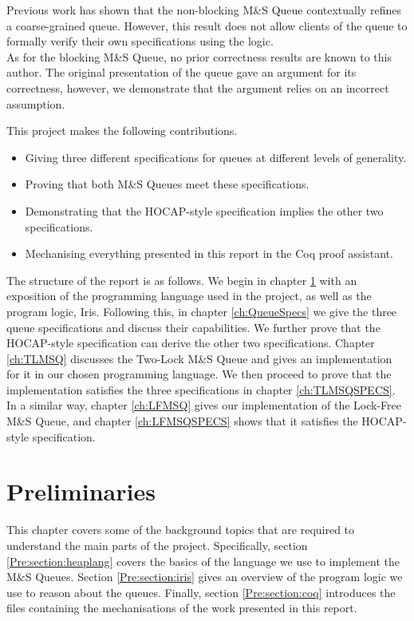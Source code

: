 \documentclass[a4paper, 10pt]{report}
\theoremstyle{definition}
\newcommand{\msq}{M\&S Queue}
\newcommand{\tlmsq}{Two-Lock \msq{}}
\newcommand{\lfmsq}{Lock-Free \msq{}}
\begin{document}
Previous work \citep{DBLP:conf/cpp/VindumB21} has shown that the non-blocking \msq{} contextually refines a coarse-grained queue. However, this result does not allow clients of the queue to formally verify their own specifications using the logic.\\
As for the blocking \msq{}, no prior correctness results are known to this author. The original presentation of the queue \citep{DBLP:conf/podc/MichaelS96} gave an argument for its correctness, however, we demonstrate that the argument relies on an incorrect assumption.

This project makes the following contributions.
\begin{itemize}
  \item Giving three different specifications for queues at different levels of generality.
  \item Proving that both \msq{}s meet these specifications.
  \item Demonstrating that the HOCAP-style specification implies the other two specifications.
  \item Mechanising everything presented in this report in the Coq proof assistant.
\end{itemize}

The structure of the report is as follows. We begin in chapter \ref{ch:pre} with an exposition of the programming language used in the project, as well as the program logic, Iris. Following this, in chapter \ref{ch:QueueSpecs} we give the three queue specifications and discuss their capabilities. We further prove that the HOCAP-style specification can derive the other two specifications. Chapter \ref{ch:TLMSQ} discusses the \tlmsq{} and gives an implementation for it in our chosen programming language. We then proceed to prove that the implementation satisfies the three specifications in chapter \ref{ch:TLMSQSPECS}. In a similar way, chapter \ref{ch:LFMSQ} gives our implementation of the \lfmsq{}, and chapter \ref{ch:LFMSQSPECS} shows that it satisfies the HOCAP-style specification.


\chapter{Preliminaries}
\label{ch:pre}

This chapter covers some of the background topics that are required to understand the main parts of the project. Specifically, section \ref{Pre:section:heaplang} covers the basics of the language we use to implement the \msq{}s. Section \ref{Pre:section:iris} gives an overview of the program logic we use to reason about the queues. Finally, section \ref{Pre:section:coq} introduces the files containing the mechanisations of the work presented in this report.
\end{document}
